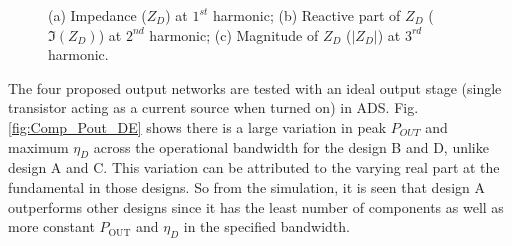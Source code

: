 \documentclass[conference]{IEEEtran}
\begin{document}
\begin{figure}[!t]
\begin{subfigure}{0.24\textwidth}
\caption{}
\label{fig:Comp_3H_Mag}
\end{subfigure}
\caption{(a) Impedance ($Z_D$) at $1^{st}$ harmonic; (b) Reactive part of $Z_D$ ($\Im(Z_D)$) at $2^{nd}$ harmonic; (c) Magnitude of $Z_D$ ($|Z_D|$) at $3^{rd}$ harmonic.}
\label{fig:Comp_1H_2H_3H}
\vspace{-0.1in}
\end{figure}


The four proposed output networks are tested with an ideal output stage (single transistor \color{blue} acting \color{black} as a current source when turned on) in ADS. Fig. \ref{fig:Comp_Pout_DE} shows there is a large variation in peak $P_{OUT}$ and maximum $\eta_D$ across the operational bandwidth for the design B and D, unlike design A and C. This variation can be attributed to the varying real part at the fundamental in those designs.
So from the simulation, it is seen that design A outperforms other designs since it has the least number of components as well as more constant $P_{\text{OUT}}$ and $\eta_D$ in the specified bandwidth.
\end{document}
